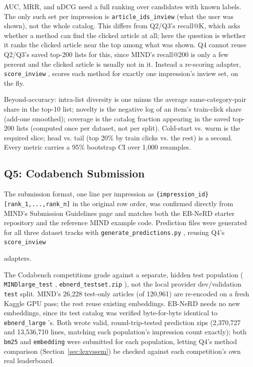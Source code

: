 \documentclass[11pt]{article}
\newcommand{\code}[1]{%
    \colorbox{gray!40}{\texttt{#1}}%
}
\begin{document}
AUC, MRR, and nDCG need a full ranking over candidates with known labels. The only such set per
impression is \code{article\_ids\_inview} (what the user was shown), not the whole catalog. This
differs from Q2/Q3's recall@K, which asks whether a method can find the clicked article at all;
here the question is whether it ranks the clicked article near the top among what was shown. Q4
cannot reuse Q2/Q3's saved top-200 lists for this, since MIND's recall@200 is only a few percent
and the clicked article is usually not in it. Instead a re-scoring adapter, \code{score\_inview},
scores each method for exactly one impression's inview set, on the fly.

Beyond-accuracy: intra-list diversity is one minus the average same-category-pair share in the
top-10 list; novelty is the negative log of an item's train-click share (add-one smoothed);
coverage is the catalog fraction appearing in the saved top-200 lists (computed once per dataset,
not per split). Cold-start vs. warm is the required slice; head vs. tail (top 20\% by train
clicks vs. the rest) is a second. Every metric carries a 95\% bootstrap CI over 1,000 resamples.

\subsection{Q5: Codabench Submission}
\label{sec:q5}

The submission format, one line per impression as
\code{\{impression\_id\} [rank\_1,...,rank\_n]} in the original row order, was confirmed
directly from MIND's Submission Guidelines page and matches both the EB-NeRD starter
repository and the reference MIND example code. Prediction files were generated for all three
dataset tracks with \code{generate\_predictions.py}, reusing Q4's \code{score\_inview}
adapters.

\begin{sloppypar}
The Codabench competitions grade against a separate, hidden test population
(\code{MINDlarge\_test}, \code{ebnerd\_testset.zip}), not the local provider dev/validation
\texttt{test} split. MIND's 26{,}228 test-only articles (of 120{,}961) are re-encoded on a fresh
Kaggle GPU pass; the rest reuse existing embeddings. EB-NeRD needs no new embeddings, since its
test catalog was verified byte-for-byte identical to \code{ebnerd\_large}'s. Both wrote valid,
round-trip-tested prediction zips (2{,}370{,}727 and 13{,}536{,}710 lines, matching each
population's impression count exactly); both \code{bm25} and \code{embedding} were submitted for
each population, letting Q4's method comparison (Section~\ref{sec:lexvssem}) be checked against
each competition's own real leaderboard.
\end{sloppypar}
\end{document}
